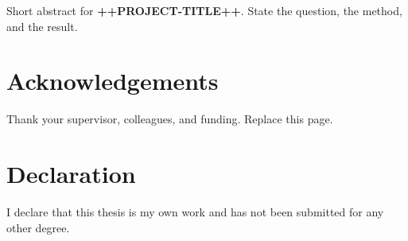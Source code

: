 \begin{thesisabstract}
Short abstract for \textbf{++PROJECT-TITLE++}.
State the question, the method, and the result.
\end{thesisabstract}

\chapter*{Acknowledgements}

Thank your supervisor, colleagues, and funding.
Replace this page.

\chapter*{Declaration}

I declare that this thesis is my own work and has not been submitted
for any other degree.
